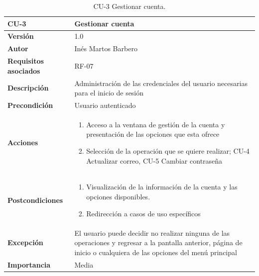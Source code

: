 \begin{table}[p]
	\centering
	\begin{tabularx}{\linewidth}{ p{} p{} }
		\toprule
		\textbf{CU-3}    & \textbf{Gestionar cuenta}\\
		\toprule
		\textbf{Versión}              & 1.0    \\
		\textbf{Autor}                & Inés Martos Barbero \\
		\textbf{Requisitos asociados} & RF-07 \\
		\textbf{Descripción}          & Administración de las credenciales del usuario necesarias para el inicio de sesión \\
		\textbf{Precondición}         & Usuario autenticado \\
		\textbf{Acciones}             &
		\begin{enumerate}
			\def\labelenumi{\arabic{enumi}.}
			\tightlist
			\item Acceso a la ventana de gestión de la cuenta y presentación de las opciones que esta ofrece
			\item Selección de la operación que se quiere realizar; CU-4 Actualizar correo, CU-5 Cambiar contraseña
		\end{enumerate}\\ 
		\textbf{Postcondiciones}        &
		\begin{enumerate}
			\def\labelenumi{\arabic{enumi}.}
			\tightlist
			\item Visualización de la información de la cuenta y las opciones disponibles.
			\item Redirección a casos de uso específicos
		\end{enumerate}\\
		\textbf{Excepción}          & El usuario puede decidir no realizar ninguna de las operaciones y regresar a la pantalla anterior, página de inicio o cualquiera de las opciones del menú principal \\
		\textbf{Importancia}          & Media \\
		\bottomrule
	\end{tabularx}
	\caption{CU-3 Gestionar cuenta.}
\end{table}



